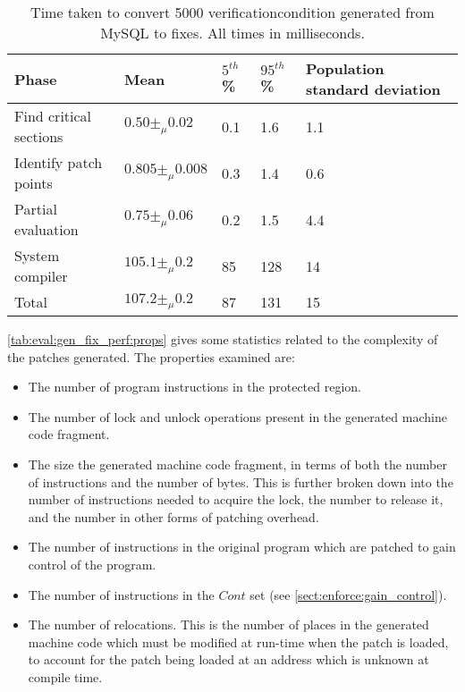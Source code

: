 \begin{table}
  \begin{tabular}{|l|l|l|l|l|}
    \hline
    Phase & Mean & $5^{th}$\% & $95^{th}$\% & Population standard deviation \\
    \hline
    Find critical sections & $0.50 \pm_\mu 0.02$ & 0.1 & 1.6 & 1.1 \\
    Identify patch points & $0.805 \pm_\mu 0.008$ & 0.3 & 1.4 & 0.6 \\
    Partial evaluation & $0.75 \pm_\mu 0.06$ & 0.2 & 1.5 & 4.4 \\
    System compiler & $105.1 \pm_\mu 0.2$ & 85 & 128 & 14 \\
    \hline
    Total & $107.2 \pm_\mu 0.2$ & 87 & 131 & 15 \\
    \hline
  \end{tabular}
  \caption{Time taken to convert 5000 \gls{verificationcondition}
    generated from MySQL to fixes.  All times in milliseconds.}
  \label{tab:eval:gen_fix_perf}
\end{table}

\autoref{tab:eval:gen_fix_perf:props} gives some statistics related to
the complexity of the patches generated.  The properties examined are:

\begin{itemize}
\item The number of program instructions in the protected region.
\item The number of lock and unlock operations present in the
  generated machine code fragment.
\item The size the generated machine code fragment, in terms of both
  the number of instructions and the number of bytes.  This is further
  broken down into the number of instructions needed to acquire the
  lock, the number to release it, and the number in other forms of
  patching overhead.
\item The number of instructions in the original program which are
  patched to gain control of the program.
\item The number of instructions in the $\mathit{Cont}$ set (see
  \autoref{sect:enforce:gain_control}).
\item The number of relocations.  This is the number of places in the
  generated machine code which must be modified at run-time when the
  patch is loaded, to account for the patch being loaded at an address
  which is unknown at compile time.
\end{itemize}


